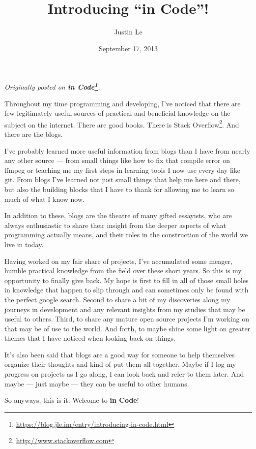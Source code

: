 \documentclass[]{article}
\title{Introducing ``in Code''!}
\author{Justin Le}
\date{September 17, 2013}
\renewcommand{\href}[2]{#2\footnote{\url{#1}}}
\begin{document}
\maketitle

\emph{Originally posted on
\textbf{\href{https://blog.jle.im/entry/introducing-in-code.html}{in Code}}.}

Throughout my time programming and developing, I've noticed that there are few
legitimately useful sources of practical and beneficial knowledge on the subject
on the internet. There are good books. There is
\href{http://www.stackoverflow.com}{Stack Overflow}. And there are the blogs.

I've probably learned more useful information from blogs than I have from nearly
any other source --- from small things like how to fix that compile error on
ffmpeg or teaching me my first steps in learning tools I now use every day like
git. From blogs I've learned not just small things that help me here and there,
but also the building blocks that I have to thank for allowing me to learn so
much of what I know now.

In addition to these, blogs are the theatre of many gifted essayists, who are
always enthusiastic to share their insight from the deeper aspects of what
programming actually means, and their roles in the construction of the world we
live in today.

Having worked on my fair share of projects, I've accumulated some meager, humble
practical knowledge from the field over these short years. So this is my
opportunity to finally give back. My hope is first to fill in all of those small
holes in knowledge that happen to slip through and can sometimes only be found
with the perfect google search. Second to share a bit of my discoveries along my
journeys in development and any relevant insights from my studies that may be
useful to others. Third, to share any mature open source projects I'm working on
that may be of use to the world. And forth, to maybe shine some light on greater
themes that I have noticed when looking back on things.

It's also been said that blogs are a good way for someone to help themselves
organize their thoughts and kind of put them all together. Maybe if I log my
progress on projects as I go along, I can look back and refer to them later. And
maybe --- just maybe --- they can be useful to other humans.

So anyways, this is it. Welcome to \textbf{in Code}!
\end{document}
